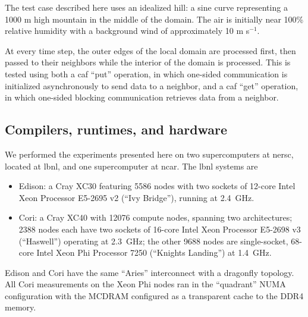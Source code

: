 The test case described here uses an idealized hill: a sine curve representing
a 1000 m high mountain in the middle of the domain.
The air is initially near 100\% relative humidity with a background wind of approximately 10 m s$^{-1}$.

At every time step, the outer edges of the local domain are processed first,
then passed to their neighbors while the interior of the domain is processed.
This is tested using both a \gls{caf} ``put'' operation, in which one-sided communication is initialized asynchronously to send data to a neighbor,
and a \gls{caf} ``get'' operation, in which one-sided blocking communication retrieves data from a neighbor.

\subsection{Compilers, runtimes, and hardware}

We performed the experiments presented here on two supercomputers at \gls{nersc},
located at \gls{lbnl}, and one supercomputer at \gls{ncar}. The \gls{lbnl} systems are
\begin{itemize}

\item Edison: a Cray XC30 featuring 5586 nodes with two sockets of 12-core Intel Xeon Processor E5-2695 v2 (``Ivy Bridge''), running at \num{2.4}~\si{\giga\hertz}.
\item Cori: a Cray XC40 with \num{12076} compute nodes, spanning two architectures; \num{2388} nodes each have two sockets of 16-core Intel Xeon Processor E5-2698 v3 (``Haswell'') operating at \num{2.3}~\si{\giga\hertz}; the other \num{9688} nodes are single-socket, 68-core Intel Xeon Phi Processor 7250 (``Knights Landing'') at \num{1.4}~\si{\giga\hertz}.
\end{itemize}
Edison and Cori have the same ``Aries'' interconnect with a dragonfly topology.
All Cori measurements on the Xeon Phi nodes ran in the ``quadrant'' NUMA configuration with the MCDRAM configured as a transparent cache to the DDR4 memory.

